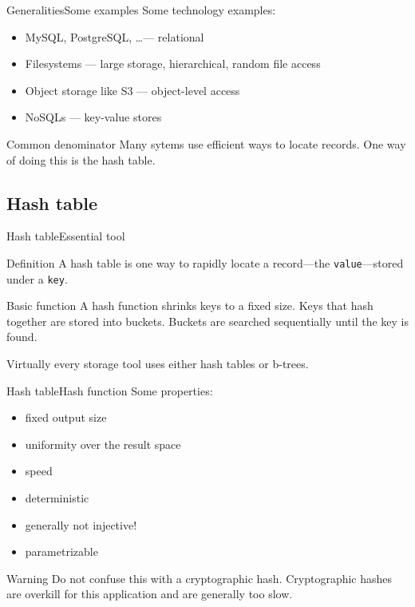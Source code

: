 \documentclass{beamer}
\begin{document}
\begin{frame}{Generalities}{Some examples}
Some technology examples:
\begin{itemize}
\item MySQL, PostgreSQL, \ldots --- relational
\item Filesystems --- large storage, hierarchical, random file access
\item Object storage like S3 --- object-level access
\item NoSQLs --- key-value stores
\end{itemize}

\begin{block}{Common denominator}
Many sytems use efficient ways to locate records. One way of doing this is
the hash table.
\end{block}
\end{frame}

\subsection{Hash table}

\begin{frame}{Hash table}{Essential tool}
\begin{block}{Definition}
A hash table is one way to rapidly locate a record---the \texttt{value}---stored under a \texttt{key}.
\end{block}

\begin{block}{Basic function}
A hash function shrinks keys to a fixed size. Keys that hash together are
stored into buckets. Buckets are searched sequentially until the key is
found.
\end{block}

Virtually every storage tool uses either hash tables or b-trees.

\end{frame}

\begin{frame}{Hash table}{Hash function}
Some properties:
\begin{itemize}
\item fixed output size
\item uniformity over the result space
\item speed
\item deterministic
\item generally not injective!
\item parametrizable
\end{itemize}

\begin{block}{Warning}
Do not confuse this with a cryptographic hash. Cryptographic hashes are overkill
for this application and are generally too slow.
\end{block}
\end{frame}
\end{document}
